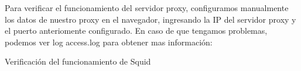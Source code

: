 Para verificar el funcionamiento del servidor proxy, configuramos manualmente los datos de nuestro proxy en el navegador, ingresando la IP del servidor proxy y el puerto anteriomente configurado.
En caso de que tengamos problemas, podemos ver log access.log para obtener mas información:

\begin{listing}[H]
  \caption{Verificación del funcionamiento de Squid}
  \label{soa:tecnologias:squid-cache07:bash-preparacion}
\end{listing}
